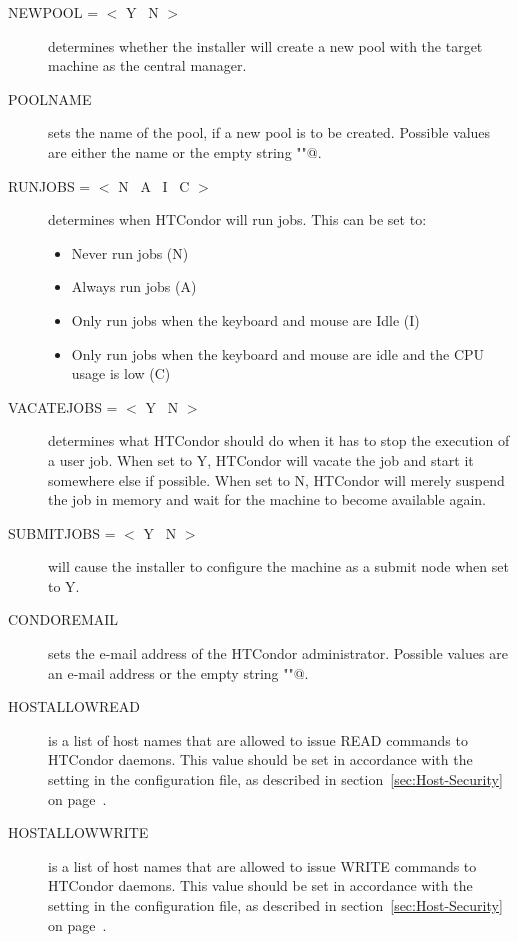 \begin{description}
\item [NEWPOOL = $<$ Y \Bar\ N $>$]
determines whether the installer will create a new pool with the target
machine as the central manager.

\item [POOLNAME]
sets the name of the pool, if a new pool is to be created. Possible values
are either the name or the empty string \verb@""@.

\item [RUNJOBS = $<$ N \Bar\ A \Bar\ I \Bar\ C $>$]
determines when HTCondor will run jobs. This can be set to:
\begin{itemize}
\item Never run jobs (N)
\item Always run jobs (A)
\item Only run jobs when the keyboard and mouse are Idle (I)
\item Only run jobs when the keyboard and mouse are idle and the CPU
usage is low (C)
\end{itemize}

\item [VACATEJOBS = $<$ Y \Bar\ N $>$]
determines what HTCondor should do when it has to stop the execution of
a user job. When set to Y, HTCondor will vacate the job and start
it somewhere else if possible. When set to N, HTCondor will merely
suspend the job in memory and wait for the machine to become available
again. 

\item[SUBMITJOBS  = $<$ Y \Bar\ N $>$]
will cause the installer to configure the machine as a submit
node when set to Y. 

\item[CONDOREMAIL]
sets the e-mail address of the HTCondor administrator. Possible values are
an e-mail address or the empty string \verb@""@.

\item[HOSTALLOWREAD]
is a list of host names that are allowed to issue READ commands to
HTCondor daemons. This value should be set in accordance with the
 setting in the configuration file, as described in
section~\ref{sec:Host-Security} on page~\pageref{sec:Host-Security}.

\item[HOSTALLOWWRITE]
is a list of host names that are allowed to issue WRITE commands to
HTCondor daemons. This value should be set in accordance with the
 setting in the configuration file, as described in
section~\ref{sec:Host-Security} on page~\pageref{sec:Host-Security}.


\end{description}
